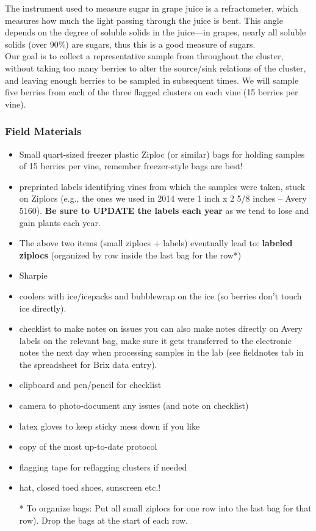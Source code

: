 \documentclass[11pt,letter]{article}
\newenvironment{smitemize}{
\begin{itemize}
  \setlength{\itemsep}{0pt}
  \setlength{\parskip}{0.8pt}
  \setlength{\parsep}{0pt}}
{\end{itemize}
}
\begin{document}
The instrument used to measure sugar in grape juice is a refractometer, which measures how much the light passing through the juice is bent. This angle depends on the degree of soluble solids in the juice---in grapes, nearly all soluble solids (over 90\%) are sugars, thus this is a good measure of sugars. \\

Our goal is to collect a representative sample from throughout the cluster, without taking too many berries to alter the source/sink relations of the cluster, and leaving enough berries to be sampled in subsequent times. We will sample five berries from each of the three flagged clusters on each vine (15 berries per vine). 

\subsubsection{Field Materials}
\begin{smitemize}
\item Small quart-sized freezer plastic Ziploc (or similar) bags for holding samples of 15 berries per vine, remember freezer-style bags are best!
\item preprinted labels identifying vines from which the samples were taken, stuck on Ziplocs (e.g., the ones we used in 2014 were 1 inch x 2 5/8 inches -- Avery 5160). {\bf Be sure to UPDATE the labels each year} as we tend to lose and gain plants each year.
\item The above two items (small ziplocs + labels) eventually lead to: {\bf labeled ziplocs} (organized by row inside the last bag for the row*)
\item Sharpie
\item coolers with ice/icepacks and bubblewrap on the ice (so berries don’t touch ice directly). 
\item checklist to make notes on issues you can also make notes directly on Avery labels on the relevant bag, make sure it gets transferred to the electronic notes the next day  when processing samples in the lab (see fieldnotes tab in the spreadsheet for Brix data entry). 
\item clipboard and pen/pencil for checklist
\item camera to photo-document any issues (and note on checklist)
\item latex gloves to keep sticky mess down if you like
\item copy of the most up-to-date protocol
\item flagging tape for reflagging clusters if needed
\item hat, closed toed shoes, sunscreen etc.!

* To organize bags: Put all small ziplocs for one row into the last bag for that row). Drop the bags at the start of each row.

\end{smitemize}
\end{document}
